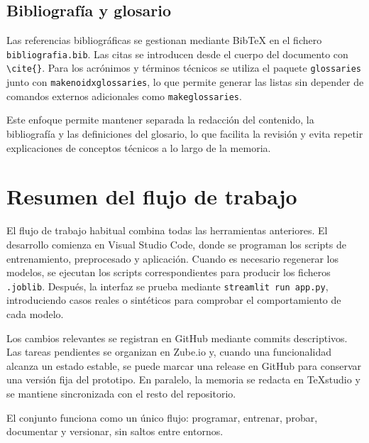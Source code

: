 \subsection{Bibliografía y glosario}

Las referencias bibliográficas se gestionan mediante BibTeX en el fichero \texttt{bibliografia.bib}. Las citas se introducen desde el cuerpo del documento con \texttt{\textbackslash cite\{\}}. Para los acrónimos y términos técnicos se utiliza el paquete \texttt{glossaries} junto con \texttt{makenoidxglossaries}, lo que permite generar las listas sin depender de comandos externos adicionales como \texttt{makeglossaries}.

Este enfoque permite mantener separada la redacción del contenido, la bibliografía y las definiciones del glosario, lo que facilita la revisión y evita repetir explicaciones de conceptos técnicos a lo largo de la memoria.

\section{Resumen del flujo de trabajo}

El flujo de trabajo habitual combina todas las herramientas anteriores. El desarrollo comienza en Visual Studio Code, donde se programan los scripts de entrenamiento, preprocesado y aplicación. Cuando es necesario regenerar los modelos, se ejecutan los scripts correspondientes para producir los ficheros \texttt{.joblib}. Después, la interfaz se prueba mediante \texttt{streamlit run app.py}, introduciendo casos reales o sintéticos para comprobar el comportamiento de cada modelo.

Los cambios relevantes se registran en GitHub mediante commits descriptivos. Las tareas pendientes se organizan en Zube.io y, cuando una funcionalidad alcanza un estado estable, se puede marcar una release en GitHub para conservar una versión fija del prototipo. En paralelo, la memoria se redacta en TeXstudio y se mantiene sincronizada con el resto del repositorio.

El conjunto funciona como un único flujo: programar, entrenar, probar, documentar y versionar, sin saltos entre entornos.


